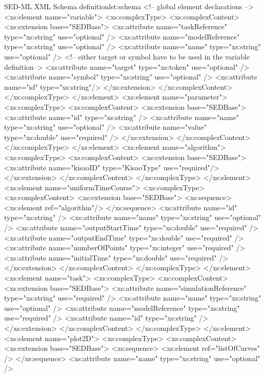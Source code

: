 \begin{myXmlLst}{SED-ML XML Schema definition}{lst:schema}
<!-- global element declarations -->
	<xs:element name="variable">
		<xs:complexType>
 		<xs:complexContent>
		<xs:extension base="SEDBase">
			<xs:attribute name="taskReference" type="xs:string" use="optional" />
			<xs:attribute name="modelReference" type="xs:string" use="optional" />
			<xs:attribute name="name" type="xs:string" use="optional" />
			<!-- either target or symbol have to be used  in the variable definition-->
			<xs:attribute name="target" type="xs:token" use="optional" />
			<xs:attribute name="symbol" type="xs:string" use="optional" />
			<xs:attribute name="id" type="xs:string"/>
		</xs:extension>
		</xs:complexContent>
		</xs:complexType>
	</xs:element>
	<xs:element name="parameter">
		<xs:complexType>
		<xs:complexContent>
		<xs:extension base="SEDBase">
		 	<xs:attribute name="id" type="xs:string" />
			<xs:attribute name="name" type="xs:string" use="optional" />
			<xs:attribute name="value" type="xs:double" use="required" />
		</xs:extension>
		</xs:complexContent>
		</xs:complexType>
	</xs:element>
	<xs:element name="algorithm">
		<xs:complexType>
		<xs:complexContent>
		<xs:extension base="SEDBase">
			<xs:attribute name="kisaoID" type="KisaoType" use="required"/>
		</xs:extension>
		</xs:complexContent>
		</xs:complexType>
	</xs:element>
	<xs:element name="uniformTimeCourse">
		<xs:complexType>
		<xs:complexContent>
		<xs:extension base="SEDBase">
			<xs:sequence>
				<xs:element ref="algorithm"/>
			</xs:sequence>
			<xs:attribute name="id" type="xs:string" />
			<xs:attribute name="name" type="xs:string" use="optional" />
			<xs:attribute name="outputStartTime" type="xs:double"
				use="required" />
			<xs:attribute name="outputEndTime" type="xs:double" use="required" />
			<xs:attribute name="numberOfPoints" type="xs:integer"
				use="required" />
			<xs:attribute name="initialTime" type="xs:double" use="required" />
		</xs:extension>
		</xs:complexContent>
		</xs:complexType>
	</xs:element>
	<xs:element name="task">
		<xs:complexType>
		<xs:complexContent>
		<xs:extension base="SEDBase">
			<xs:attribute name="simulationReference" type="xs:string"
				use="required" />
			<xs:attribute name="name" type="xs:string" use="optional" />
			<xs:attribute name="modelReference" type="xs:string"
				use="required" />
			<xs:attribute name="id" type="xs:string" />
		</xs:extension>
		</xs:complexContent>
		</xs:complexType>
	</xs:element>
	<xs:element name="plot2D">
		<xs:complexType>
		<xs:complexContent>
		<xs:extension base="SEDBase">
			<xs:sequence>
				<xs:element ref="listOfCurves" />
			</xs:sequence>
			<xs:attribute name="name" type="xs:string" use="optional" />

\end{myXmlLst}
